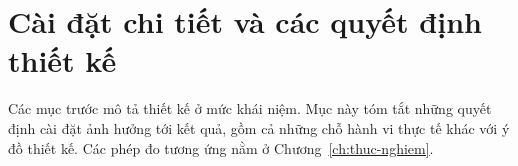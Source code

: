 \providecommand{\trichma}[3]{\par{\linespread{1}\selectfont
  }}

\section{Cài đặt chi tiết và các quyết định thiết kế}
\label{sec:cs-cai-dat}
Các mục trước mô tả thiết kế ở mức khái niệm. Mục này tóm tắt những quyết định cài đặt ảnh hưởng tới kết quả, gồm cả
những chỗ hành vi thực tế khác với ý đồ thiết kế. Các phép đo tương ứng nằm ở Chương~\ref{ch:thuc-nghiem}.

